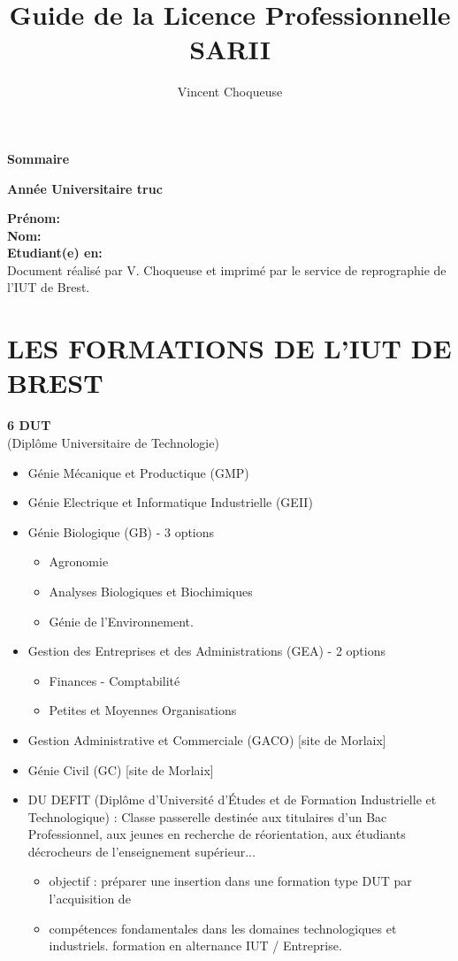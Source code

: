 \documentclass[11pt]{article}
\author{Vincent Choqueuse}
\newcommand{\promotion}{ truc}
\newcommand{\formationshort}{SARII}
\newcommand{\mysection}[1]
{
{
\setlength{\fboxsep}{0cm}
\noindent
\begin{minipage}{\linewidth}
\section{\large \textbf{#1}}
\vspace*{-10pt}
\end{minipage}\vspace*{10pt}
}
}
\begin{document}
\thispagestyle{empty}

\setcounter{tocdepth}{1}
\vspace*{0.5cm}
\begin{center}
\huge \textbf{Sommaire}
\end{center}
\tableofcontents
\vspace*{1.5cm}
\begin{center}
\huge \textbf{Année Universitaire \promotion}
\end{center}
\textbf{Prénom:}\\
\textbf{Nom:}\\
\textbf{Etudiant(e) en:}\\
\vfill
Document réalisé par V. Choqueuse et imprimé par le service de reprographie de l'IUT de Brest.
\newpage

\title{Guide de la Licence Professionnelle \formationshort}

\mysection{LES FORMATIONS DE L'IUT DE BREST}
\begin{center}
\textbf{6 DUT}\\
(Diplôme Universitaire de Technologie)
\vspace*{1cm}
\end{center}
\renewcommand{\labelitemi}{\footnotesize $\blacksquare$}
\begin{itemize}
\itemsep 0.4cm
\item Génie Mécanique et Productique (GMP)
\item Génie Electrique et Informatique Industrielle (GEII)
\item Génie Biologique (GB) - 3 options
\begin{itemize}
\item Agronomie
\item Analyses Biologiques et Biochimiques
\item Génie de l'Environnement.
\end{itemize}
\item Gestion des Entreprises et des Administrations (GEA) - 2 options
\begin{itemize}
\item Finances - Comptabilité
\item Petites et Moyennes Organisations
\end{itemize}
\item Gestion Administrative et Commerciale (GACO) [site de Morlaix]
\item Génie Civil (GC) [site de Morlaix]
\item DU DEFIT (Diplôme d'Université d'Études et de Formation Industrielle et   Technologique) :
Classe passerelle destinée aux titulaires d'un Bac Professionnel, aux   jeunes en recherche de réorientation, aux étudiants décrocheurs de l'enseignement supérieur...
\begin{itemize}
\item objectif : préparer une insertion dans une formation type DUT par l'acquisition de \item compétences fondamentales dans les domaines technologiques et industriels.
formation en alternance IUT / Entreprise.\\
\end{itemize}
\end{itemize}
\end{document}
